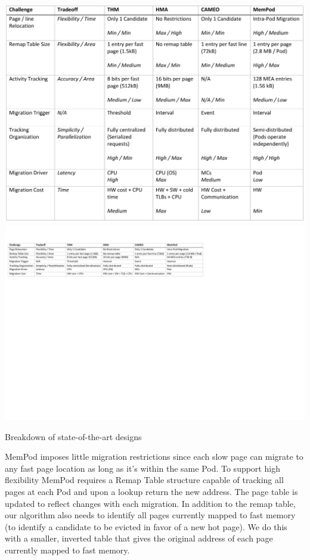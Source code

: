 \begin{table}[t]
  \ifOldResults
  \includegraphics[width=\linewidth]{figures/comparison_table.pdf}
  \else
  \includegraphics[width=\textwidth]{figures/revised/new/comparison_table.pdf}
  \fi
  \caption{Breakdown of state-of-the-art designs}
  \label{tbl:breakdown}
\end{table}

MemPod imposes little migration restrictions since each slow page can migrate to any fast page location as long as it's within the same Pod. To support high flexibility MemPod requires a Remap Table structure capable of tracking all pages at each Pod and upon a lookup return the new address. The page table is updated to reflect changes with each migration. In addition to the remap table, our algorithm also needs to identify all pages currently mapped to fast memory (to identify a candidate to be evicted in favor of a new hot page). We do this with a smaller, inverted table that gives the original address of each page currently mapped to fast memory.

